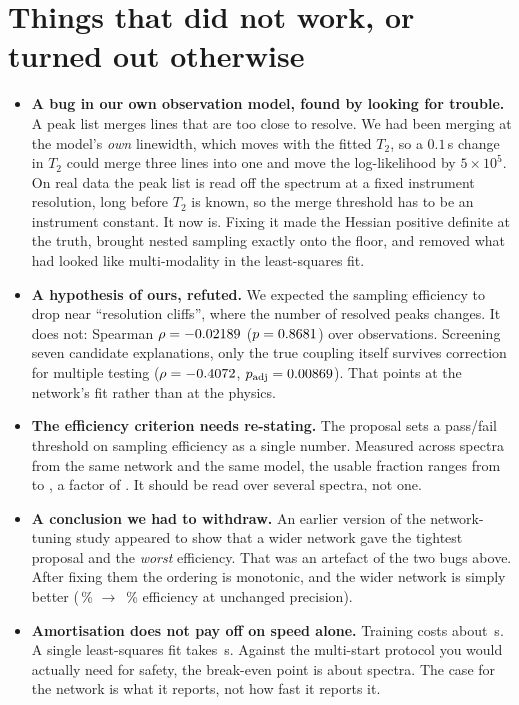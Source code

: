 \documentclass[11pt,a4paper]{article}
\begin{document}
\section{Things that did not work, or turned out otherwise}

\begin{itemize}

\item \textbf{A bug in our own observation model, found by looking for
trouble.} A peak list merges lines that are too close to resolve. We had been
merging at the model's \emph{own} linewidth, which moves with the fitted $T_2$,
so a $0.1$\,s change in $T_2$ could merge three lines into one and move the
log-likelihood by $5\times10^5$. On real data the peak list is read off the
spectrum at a fixed instrument resolution, long before $T_2$ is known, so the
merge threshold has to be an instrument constant. It now is. Fixing it made the
Hessian positive definite at the truth, brought nested sampling exactly onto the
floor, and removed what had looked like multi-modality in the least-squares fit.

\item \textbf{A hypothesis of ours, refuted.} We expected the sampling
efficiency to drop near ``resolution cliffs'', where the number of resolved
peaks changes. It does not: Spearman $\rho = -0.02189$
($p = 0.8681$) over \zCliffsNObs{} observations. Screening seven
candidate explanations, only the true coupling itself survives correction for
multiple testing ($\rho = -0.4072$, $p_{\rm adj} = 0.00869$).
That points at the network's fit rather than at the physics.

\item \textbf{The efficiency criterion needs re-stating.} The proposal sets a
pass/fail threshold on sampling efficiency as a single number. Measured across
\zEfficiencyNObs{} spectra from the same network and the same model, the usable
fraction ranges from \zEfficiencyMin{} to \zEfficiencyMax{}, a factor of
\zEfficiencySpread{}. It should be read over several spectra, not one.

\item \textbf{A conclusion we had to withdraw.} An earlier version of the
network-tuning study appeared to show that a wider network gave the tightest
proposal and the \emph{worst} efficiency. That was an artefact of the two bugs
above. After fixing them the ordering is monotonic, and the wider network is
simply better (\zTightenBaselineEfficiencyPct\,\% $\to$
\zTightenBestEfficiencyPct\,\% efficiency at unchanged precision).

\item \textbf{Amortisation does not pay off on speed alone.} Training costs
about \zBaselineFormicTrainSeconds\,s. A single least-squares fit takes
\zBaselineFormicSecondsPerFit\,s. Against the multi-start protocol you would
actually need for safety, the break-even point is about
\zBaselineFormicBreakevenMultistart{} spectra. The case for the network is what
it reports, not how fast it reports it.

\end{itemize}
\end{document}
